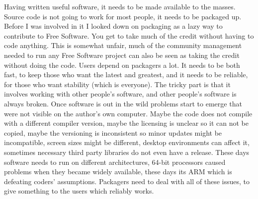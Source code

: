 Having written useful software, it needs to be made available to the masses.
Source code is not going to work for most people, it needs to be packaged up.
Before I was involved in it I looked down on packaging as a lazy way to
contribute to Free Software. You get to take much of the credit without having
to code anything. This is somewhat unfair, much of the community management
needed to run any Free Software project can also be seen as taking the credit
without doing the code.
Users depend on packagers a lot. It needs to be both fast, to keep those who
want the latest and greatest, and it needs to be reliable, for those who want
stability (which is everyone). The tricky part is that it involves working with
other people’s software, and other people’s software is always broken. Once
software is out in the wild problems start to emerge that were not visible on
the author’s own computer. Maybe the code does not compile with a different
compiler version, maybe the licensing is unclear so it can not be copied, maybe
the versioning is inconsistent so minor updates might be incompatible, screen
sizes might be different, desktop environments can affect it, sometimes
necessary third party libraries do not even have a release. These days software
needs to run on different architectures, 64-bit processors caused problems when
they became widely available, these days its ARM which is defeating coders’
assumptions. Packagers need to deal with all of these issues, to give something
to the users which reliably works.

